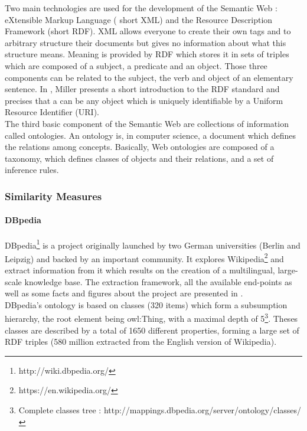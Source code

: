 Two main technologies are used for the development of the Semantic Web : eXtensible Markup Language ( short XML) and the Resource Description Framework (short RDF). XML allows everyone to create their own tags and to arbitrary structure their documents but gives no information about what this structure means. Meaning is provided by RDF which stores it in sets of triples which are composed of a subject, a predicate and an object. Those three components can be related to the subject, the verb and object of an elementary sentence. In \cite{miller}, Miller presents a short introduction to the RDF standard and precises that a  can be any object which is uniquely identifiable by a Uniform Resource Identifier (URI).\\

The third basic component of the Semantic Web are collections of information called ontologies. An ontology is, in computer science, a document which defines the relations among concepts. Basically, Web ontologies are composed of a taxonomy, which defines classes of objects and their relations, and a set of inference rules.\\

\subsubsection{Similarity Measures} %
\label{ssub:similarity_measures}
\paragraph{DBpedia} %
\label{par:dbpedia}
DBpedia\footnote{http://wiki.dbpedia.org/} is a project originally launched by two German universities (Berlin and Leipzig) and backed by an important community. It explores Wikipedia\footnote{https://en.wikipedia.org/} and extract information from it which results on the creation of a multilingual, large-scale knowledge base. The extraction framework, all the available end-points as well as some facts and figures about the project are presented in \cite{lehman}.\\

DBpedia's ontology is based on classes (320 items) which form a subsumption hierarchy, the root element being owl:Thing, with a maximal depth of 5\footnote{Complete classes tree : http://mappings.dbpedia.org/server/ontology/classes/}. Theses classes are described by a total of 1650 different properties, forming a large set of RDF triples (580 million extracted from the English version of Wikipedia).\\

